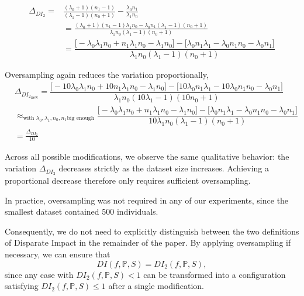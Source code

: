 \documentclass[runningheads, orivec]{llncs}
\begin{document}
\begin{enumerate}
\begin{equation}\begin{aligned}
        \Delta_{DI_2} = & \frac{(\lambda_0 + 1) (n_1 - 1)}{(\lambda_1 - 1)(n_0 + 1)} - \frac{\lambda_0   n_1}{\lambda_1 n_0} \\ \label{app:eq:change_4}
        & = \frac{(\lambda_0 + 1) (n_1 - 1)\lambda_1 n_0 - \lambda_0   n_1(\lambda_1 - 1)(n_0 + 1)}{\lambda_1 n_0(\lambda_1 - 1)(n_0 + 1)} \\
        & = \dfrac{\Big[-\lambda_0\lambda_1n_0 + n_1\lambda_1n_0 - \lambda_1n_0 \Big] - \Big[\lambda_0n_1\lambda_1 - \lambda_0n_1n_0 -\lambda_0n_1 \Big]}{\lambda_1 n_0(\lambda_1 - 1)(n_0 + 1)}
    \end{aligned}
    \end{equation}

Oversampling again reduces the variation proportionally,
\begin{equation}\begin{aligned}
        & \Delta_{{DI_2}_{\text{new}}}  = \dfrac{\Big[-10\lambda_0\lambda_1n_0 + 10n_1\lambda_1n_0 - \lambda_1n_0 \Big] - \Big[10\lambda_0n_1\lambda_1 - 10\lambda_0n_1n_0 -\lambda_0n_1 \Big]}{\lambda_1 n_0(10\lambda_1 - 1)(10n_0 + 1)} \\ 
    & \approx_{\text{with } \lambda_0, \lambda_1, n_0, n_1 \text{big enough}} \dfrac{\Big[-\lambda_0\lambda_1n_0 + n_1\lambda_1n_0 - \lambda_1n_0 \Big] - \Big[\lambda_0n_1\lambda_1 - \lambda_0n_1n_0 -\lambda_0n_1 \Big]}{10\lambda_1 n_0(\lambda_1 - 1)(n_0 + 1)} \\
    & = \frac{\Delta_{DI_2}}{10}
    \end{aligned}
    \end{equation}

\end{enumerate}

Across all possible modifications, we observe the same qualitative behavior: the variation $\Delta_{DI_2}$ decreases strictly as the dataset size increases. Achieving a proportional decrease therefore only requires sufficient oversampling.

In practice, oversampling was not required in any of our experiments, since the smallest dataset contained 500 individuals.

Consequently, we do not need to explicitly distinguish between the two definitions of Disparate Impact in the remainder of the paper. By applying oversampling if necessary, we can ensure that
\[
DI(f,\mathbb{P},S) = DI_2(f,\mathbb{P},S),
\]
since any case with $DI_2(f,\mathbb{P},S) < 1$ can be transformed into a configuration satisfying $DI_2(f,\mathbb{P},S) \leq 1$ after a single modification.
\end{document}
